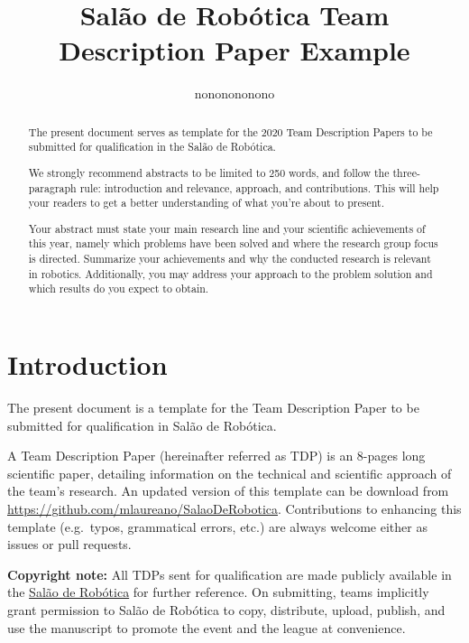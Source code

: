 \documentclass[12pt]{article}
\title{Salão de Robótica Team Description Paper Example}
\author{nononononono\inst{1} }
\begin{document}
\maketitle

%
%

\begin{abstract}
The present document serves as template for the 2020 Team Description Papers to be submitted for qualification in the Salão de Robótica.

We strongly recommend abstracts to be limited to 250 words, and follow the three-paragraph rule: introduction and relevance, approach, and contributions. This will help your readers to get a better understanding of what you're about to present.

Your abstract must state your main research line and your scientific achievements of this year, namely which problems have been solved and where the research group focus is directed.
Summarize your achievements and why the conducted research is relevant in robotics.
Additionally, you may address your approach to the problem solution and which results do you expect to obtain.
\end{abstract}



\section{Introduction}
The present document is a template for the Team Description Paper to be submitted for qualification in Salão de Robótica.

A Team Description Paper (hereinafter referred as TDP) is an 8-pages long scientific paper, detailing information on the technical and scientific approach of the team's research.
An updated version of this template can be download from {\small\url{https://github.com/mlaureano/SalaoDeRobotica}}.
Contributions to enhancing this template (e.g.~typos, grammatical errors, etc.) are always welcome either as issues or pull requests.

\textbf{Copyright note:} All TDPs sent for qualification are made publicly available in the \href{https://www.salaoderobotica.org.br}{Salão de Robótica} for further reference.
On submitting, teams implicitly grant permission to Salão de Robótica to copy, distribute, upload, publish, and use the manuscript to promote the event and the league at convenience.
\end{document}

